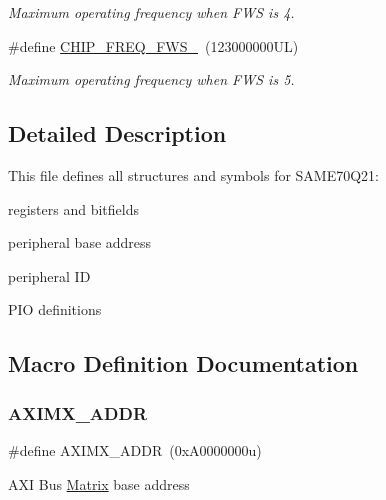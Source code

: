 \begin{DoxyCompactItemize}
\begin{DoxyCompactList}\small\item\em Maximum operating frequency when F\+WS is 4. \end{DoxyCompactList}\item 
\mbox{\label{group__SAME70Q21__definitions_ga3b66824f858591135877b369f98d48a5}} 
\#define \mbox{\hyperlink{group__SAME70Q21__definitions_ga3b66824f858591135877b369f98d48a5}{C\+H\+I\+P\+\_\+\+F\+R\+E\+Q\+\_\+\+F\+W\+S\+\_}}~(123000000\+U\+L)
\begin{DoxyCompactList}\small\item\em Maximum operating frequency when F\+WS is 5. \end{DoxyCompactList}\end{DoxyCompactItemize}


\subsection{Detailed Description}
This file defines all structures and symbols for S\+A\+M\+E70\+Q21\+:
\begin{DoxyItemize}
\item registers and bitfields
\item peripheral base address
\item peripheral ID
\item P\+IO definitions 
\end{DoxyItemize}

\subsection{Macro Definition Documentation}
\mbox{\label{group__SAME70Q21__definitions_ga2fb7cc681bf5e7fbce5e3635b72a330a}} 
\subsubsection{\texorpdfstring{AXIMX\_ADDR}{AXIMX\_ADDR}}
{\footnotesize\ttfamily \#define A\+X\+I\+M\+X\+\_\+\+A\+D\+DR~(0x\+A0000000u)}

A\+XI Bus \mbox{\hyperlink{structMatrix}{Matrix}} base address \mbox{\label{group__SAME70Q21__definitions_ga26626a425f7ebb3a0c2dbc276f0d9f78}} 
